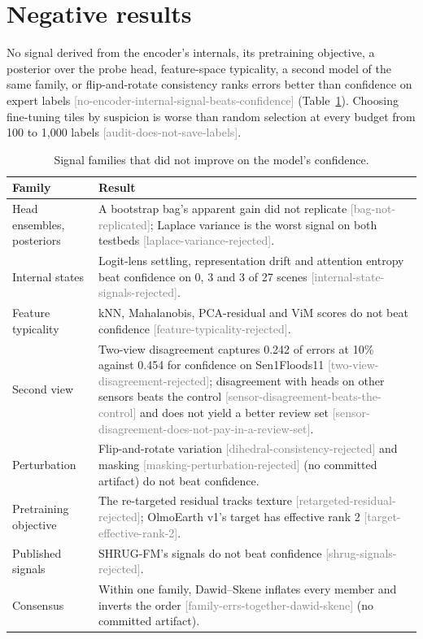 \documentclass[11pt,a4paper]{article}
\newcommand{\claim}[1]{{\scriptsize\textsf{\textcolor{gray}{[#1]}}}}
\begin{document}
\section{Negative results}
\label{sec:neg}

No signal derived from the encoder's internals, its pretraining objective, a posterior over the probe head,
feature-space typicality, a second model of the same family, or flip-and-rotate consistency ranks errors better than
confidence on expert labels \claim{no-encoder-internal-signal-beats-confidence} (Table~\ref{tab:neg}). Choosing
fine-tuning tiles by suspicion is worse than random selection at every budget from 100 to 1,000 labels
\claim{audit-does-not-save-labels}.

\begin{table}[h]
\centering\small
\begin{tabularx}{\linewidth}{lX}
\toprule
Family & Result \\
\midrule
Head ensembles, posteriors & A bootstrap bag's apparent gain did not replicate \claim{bag-not-replicated}; Laplace variance is the worst signal on both testbeds \claim{laplace-variance-rejected}. \\
Internal states & Logit-lens settling, representation drift and attention entropy beat confidence on 0, 3 and 3 of 27 scenes \claim{internal-state-signals-rejected}. \\
Feature typicality & kNN, Mahalanobis, PCA-residual and ViM scores do not beat confidence \claim{feature-typicality-rejected}. \\
Second view & Two-view disagreement captures 0.242 of errors at 10\% against 0.454 for confidence on Sen1Floods11 \claim{two-view-disagreement-rejected}; disagreement with heads on other sensors beats the control \claim{sensor-disagreement-beats-the-control} and does not yield a better review set \claim{sensor-disagreement-does-not-pay-in-a-review-set}. \\
Perturbation & Flip-and-rotate variation \claim{dihedral-consistency-rejected} and masking \claim{masking-perturbation-rejected} (no committed artifact) do not beat confidence. \\
Pretraining objective & The re-targeted residual tracks texture \claim{retargeted-residual-rejected}; OlmoEarth v1's target has effective rank 2 \claim{target-effective-rank-2}. \\
Published signals & SHRUG-FM's signals \citep{gonzalez2025} do not beat confidence \claim{shrug-signals-rejected}. \\
Consensus & Within one family, Dawid--Skene \citep{dawid1979} inflates every member and inverts the order \claim{family-errs-together-dawid-skene} (no committed artifact). \\
\bottomrule
\end{tabularx}
\caption{Signal families that did not improve on the model's confidence.}
\label{tab:neg}
\end{table}
\end{document}
